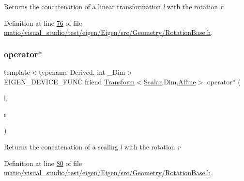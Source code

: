 \begin{DoxyReturn}{Returns}
the concatenation of a linear transformation {\itshape l} with the rotation {\itshape r} 
\end{DoxyReturn}


Definition at line \hyperlink{matio_2visual__studio_2test_2eigen_2_eigen_2src_2_geometry_2_rotation_base_8h_source_l00076}{76} of file \hyperlink{matio_2visual__studio_2test_2eigen_2_eigen_2src_2_geometry_2_rotation_base_8h_source}{matio/visual\+\_\+studio/test/eigen/\+Eigen/src/\+Geometry/\+Rotation\+Base.\+h}.

\mbox{\label{class_eigen_1_1_rotation_base_a507ee9474b9d648cdc9d294f4e944d60}} 
\subsubsection{\texorpdfstring{operator$\ast$}{operator*}\hspace{0.1cm}{\footnotesize\ttfamily [3/4]}}
{\footnotesize\ttfamily template$<$typename Derived, int \+\_\+\+Dim$>$ \\
E\+I\+G\+E\+N\+\_\+\+D\+E\+V\+I\+C\+E\+\_\+\+F\+U\+NC friend \hyperlink{group___geometry___module_class_eigen_1_1_transform}{Transform}$<$\hyperlink{class_eigen_1_1_rotation_base_af9b43eac462d7aa70b018efd49c13ef4}{Scalar},Dim,\hyperlink{group__enums_ggaee59a86102f150923b0cac6d4ff05107a71e768e0581725d919d0b05f4cb83234}{Affine}$>$ operator$\ast$ (\begin{DoxyParamCaption}\item[{const \hyperlink{group___core___module_class_eigen_1_1_diagonal_matrix}{Diagonal\+Matrix}$<$ \hyperlink{class_eigen_1_1_rotation_base_af9b43eac462d7aa70b018efd49c13ef4}{Scalar}, Dim $>$ \&}]{l,  }\item[{const Derived \&}]{r }\end{DoxyParamCaption})\hspace{0.3cm}{\ttfamily [friend]}}

\begin{DoxyReturn}{Returns}
the concatenation of a scaling {\itshape l} with the rotation {\itshape r} 
\end{DoxyReturn}


Definition at line \hyperlink{matio_2visual__studio_2test_2eigen_2_eigen_2src_2_geometry_2_rotation_base_8h_source_l00080}{80} of file \hyperlink{matio_2visual__studio_2test_2eigen_2_eigen_2src_2_geometry_2_rotation_base_8h_source}{matio/visual\+\_\+studio/test/eigen/\+Eigen/src/\+Geometry/\+Rotation\+Base.\+h}.

